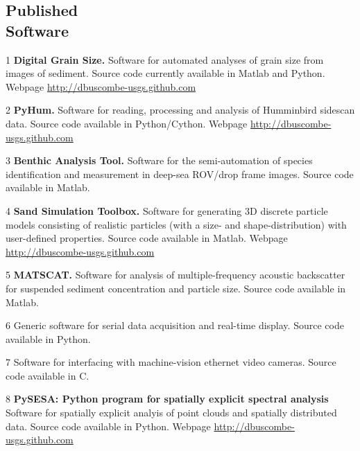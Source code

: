 \documentclass[margin,line]{resume}
\begin{document}
\begin{resume}
\begin{footnotesize}
\begin{list1}
	\end{list1}
        \end{footnotesize}

	\subsection{\mysidestyle Published \\ Software}

        \begin{footnotesize}
	\begin{list1}
	 
	\item[1] {\bf Digital Grain Size.} Software for automated analyses of grain size from images of sediment. Source code currently available in Matlab and Python. Webpage \url{http://dbuscombe-usgs.github.com}\\
	\item[2] {\bf PyHum.} Software for reading, processing and analysis of Humminbird sidescan data. Source code available in Python/Cython. Webpage \url{http://dbuscombe-usgs.github.com}\\
	\item[3] {\bf Benthic Analysis Tool.} Software for the semi-automation of species identification and measurement in deep-sea ROV/drop frame images. Source code available in Matlab.\\
        \item[4] {\bf Sand Simulation Toolbox.} Software for generating 3D discrete particle models consisting of realistic particles (with a size- and shape-distribution) with user-defined properties. Source code available in Matlab. Webpage \url{http://dbuscombe-usgs.github.com}\\
        \item[5] {\bf MATSCAT.} Software for analysis of multiple-frequency acoustic backscatter for suspended sediment concentration and particle size. Source code available in Matlab.\\
      \item[6] Generic software for serial data acquisition and real-time display. Source code available in Python.\\
        \item[7] Software for interfacing with machine-vision ethernet video cameras. Source code available in C.\\
	\item[8] {\bf PySESA: Python program for spatially explicit spectral analysis } Software for spatially explicit analyis of point clouds and spatially distributed data. Source code available in Python. Webpage \url{http://dbuscombe-usgs.github.com}


\end{list1}
\end{footnotesize}
\end{resume}
\end{document}
